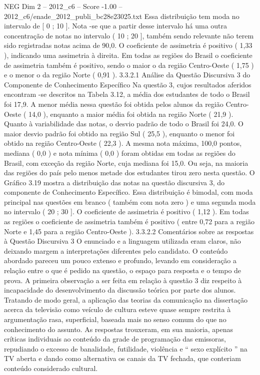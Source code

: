 \begin{textsample}{NEG Dim 2 – 2012\_c6 – Score -1.00 – 2012\_c6/enade\_2012\_publi\_bc28e23025.txt}
Essa distribuição tem moda no intervalo de [ 0 ; 10 ].
Nota -se que a partir desse intervalo há uma outra concentração de notas no intervalo ( 10 ; 20 ], também sendo relevante não terem sido registradas notas acima de 90,0.
O coeficiente de assimetria é positivo ( 1,33 ), indicando uma assimetria à direita.
Em todas as regiões do Brasil o coeficiente de assimetria também é positivo, sendo o maior o da região Centro-Oeste ( 1,75 ) e o menor o da região Norte ( 0,91 ). 3.3.2.1 Análise da Questão Discursiva 3 do Componente de Conhecimento Específico Na questão 3, cujos resultados aferidos encontram -se descritos na Tabela 3.12, a média dos estudantes de todo o Brasil foi 17,9.
A menor média nessa questão foi obtida pelos alunos da região Centro-Oeste ( 14,0 ), enquanto a maior média foi obtida na região Norte ( 21,9 ).
Quanto à variabilidade das notas, o desvio padrão de todo o Brasil foi 24,0.
O maior desvio padrão foi obtido na região Sul ( 25,5 ), enquanto o menor foi obtido na região Centro-Oeste ( 22,3 ).
A mesma nota máxima, 100,0 pontos, mediana ( 0,0 ) e nota mínima ( 0,0 ) foram obtidas em todas as regiões do Brasil, com exceção da região Norte, cuja mediana foi 15,0.
Ou seja, na maioria das regiões do país pelo menos metade dos estudantes tirou zero nesta questão.
O Gráfico 3.19 mostra a distribuição das notas na questão discursiva 3, do componente de Conhecimento Específico.
Essa distribuição é bimodal, com moda principal nas questões em branco ( também com nota zero ) e uma segunda moda no intervalo ( 20 ; 30 ].
O coeficiente de assimetria é positivo ( 1,12 ).
Em todas as regiões o coeficiente de assimetria também é positivo ( entre 0,72 para a região Norte e 1,45 para a região Centro-Oeste ). 3.3.2.2 Comentários sobre as respostas à Questão Discursiva 3 O enunciado e a linguagem utilizada eram claros, não deixando margem a interpretações diferentes pelo candidato.
O conteúdo abordado pareceu um pouco extenso e profundo, levando em consideração a relação entre o que é pedido na questão, o espaço para resposta e o tempo de prova.
A primeira observação a ser feita em relação à questão 3 diz respeito à incapacidade do desenvolvimento da discussão teórica por parte dos alunos.
Tratando de modo geral, a aplicação das teorias da comunicação na dissertação acerca da televisão como veículo de cultura esteve quase sempre restrita à argumentação rasa, superficial, baseada mais no senso comum do que no conhecimento do assunto.
As respostas trouxeram, em sua maioria, apenas críticas individuais ao conteúdo da grade de programação das emissoras, repudiando o excesso de banalidade, futilidade, violência e “ sexo explícito ” na TV aberta e dando como alternativa os canais da TV fechada, que conteriam conteúdo considerado cultural.

\end{textsample}
